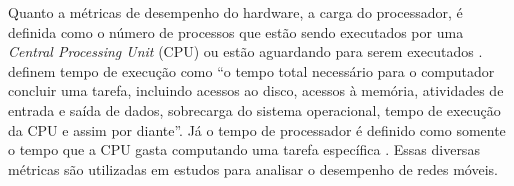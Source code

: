 Quanto a métricas de desempenho do hardware, a carga do processador, é definida como o número de processos que estão sendo executados por uma \textit{Central Processing Unit} (CPU) ou estão aguardando para serem executados \cite{Sebastian2014}.
 definem tempo de execução como ``o tempo total necessário para o computador concluir uma tarefa, incluindo acessos ao disco, acessos à memória, atividades de entrada e saída de dados, sobrecarga do sistema operacional, tempo de execução da CPU e assim por diante''.
Já o tempo de processador é definido como somente o tempo que a CPU gasta computando uma tarefa específica \cite{Patterson2014-qv}.
Essas diversas métricas são utilizadas em estudos para analisar o desempenho de redes móveis.